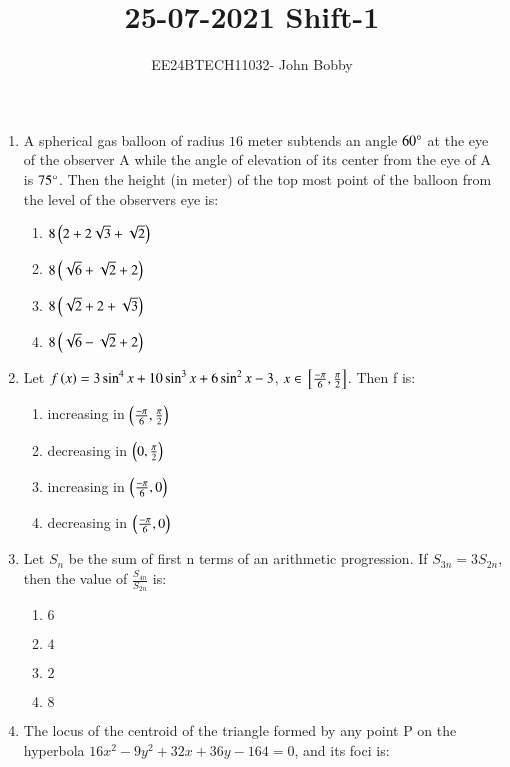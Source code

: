 \documentclass[journal,12pt,onecolumn]{IEEEtran}
\theoremstyle{remark}
\begin{document}

\vspace{3cm}

\title{\textbf{25-07-2021 Shift-1}}
\author{EE24BTECH11032- John Bobby}
\maketitle
\bigskip

\renewcommand{\thefigure}{\theenumi}
\renewcommand{\thetable}{\theenumi}
\setlength{\columnsep}{2.5em}

\begin{enumerate}
	\item A spherical gas balloon of radius $16$ meter subtends an angle $60\degree$ at the eye of the observer A while the angle of elevation of its center from the eye of A is $75\degree$. Then the height (in meter) of the top most point of the balloon from the level of the observers eye is:
		\begin{enumerate}
			\item $8\left(2+2\sqrt{3}+\sqrt{2}\right)$
			\item $8\left(\sqrt{6}+\sqrt{2}+2\right)$
			\item $8\left(\sqrt{2}+2+\sqrt{3}\right)$
			\item $8\left(\sqrt{6}-\sqrt{2}+2\right)$
		\end{enumerate}
	\item Let $f\left(x\right)=3\sin^4{x}+10\sin^3{x}+6\sin^2{x}-3$, $x \in {}\left[\frac{-\pi}{6}, \frac{\pi}{2}\right]$. Then f is:
		\begin{enumerate}
			\item increasing in $\left(\frac{-\pi}{6},\frac{\pi}{2}\right)$
			\item decreasing in $\left(0,\frac{\pi}{2}\right)$
			\item increasing in $\left(\frac{-\pi}{6},0\right)$
			\item decreasing in $\left(\frac{-\pi}{6},0\right)$
		\end{enumerate}
    \item Let $S_n$ be the sum of first n terms of an arithmetic progression. If $S_{3n}=3S_{2n}$, then the value of $\frac{S_{4n}}{S_{2n}}$ is:
    \begin{enumerate}
        \item $6$
        \item $4$
        \item $2$
        \item $8$
    \end{enumerate}
    \item The locus of the centroid of the triangle formed by any point P on the hyperbola $16x^2-9y^2+32x+36y-164=0$, and its foci is:

\end{enumerate}
\end{document}
